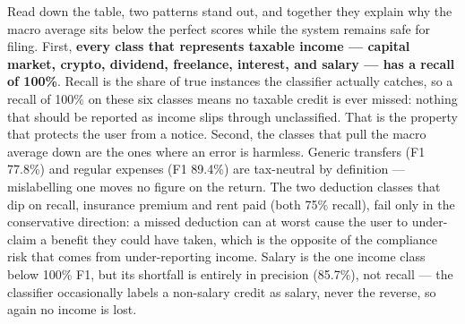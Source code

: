 Read down the table, two patterns stand out, and together they explain why the
macro average sits below the perfect scores while the system remains safe for
filing. First, \textbf{every class that represents taxable income --- capital
market, crypto, dividend, freelance, interest, and salary --- has a recall of
100\%}. Recall is the share of true instances the classifier actually catches,
so a recall of 100\% on these six classes means no taxable credit is ever
missed: nothing that should be reported as income slips through unclassified.
That is the property that protects the user from a notice. Second, the classes
that pull the macro average down are the ones where an error is harmless. Generic
transfers (F1 77.8\%) and regular expenses (F1 89.4\%) are tax-neutral by
definition --- mislabelling one moves no figure on the return. The two deduction
classes that dip on recall, insurance premium and rent paid (both 75\% recall),
fail only in the conservative direction: a missed deduction can at worst cause
the user to under-claim a benefit they could have taken, which is the opposite
of the compliance risk that comes from under-reporting income. Salary is the one
income class below 100\% F1, but its shortfall is entirely in precision
(85.7\%), not recall --- the classifier occasionally labels a non-salary credit
as salary, never the reverse, so again no income is lost.

